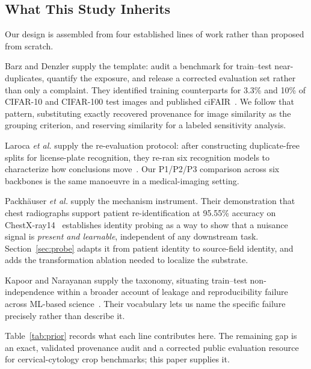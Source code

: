 \documentclass[conference]{IEEEtran}
\newcommand{\protocol}[1]{\textsf{#1}}
\begin{document}
\subsection{What This Study Inherits}
Our design is assembled from four established lines of work rather than proposed from scratch.

Barz and Denzler supply the template: audit a benchmark for train--test near-duplicates, quantify the exposure, and release a corrected evaluation set rather than only a complaint.
They identified training counterparts for 3.3\% and 10\% of CIFAR-10 and CIFAR-100 test images and published ciFAIR~\cite{barz2020cifair}.
We follow that pattern, substituting exactly recovered provenance for image similarity as the grouping criterion, and reserving similarity for a labeled sensitivity analysis.

Laroca \emph{et al.} supply the re-evaluation protocol: after constructing duplicate-free splits for license-plate recognition, they re-ran six recognition models to characterize how conclusions move~\cite{laroca2023lpr}.
Our \protocol{P1}/\protocol{P2}/\protocol{P3} comparison across six backbones is the same manoeuvre in a medical-imaging setting.

Packh\"auser \emph{et al.} supply the mechanism instrument.
Their demonstration that chest radiographs support patient re-identification at 95.55\% accuracy on ChestX-ray14~\cite{packhauser2022reidentification} establishes identity probing as a way to show that a nuisance signal is \emph{present and learnable}, independent of any downstream task.
Section~\ref{sec:probe} adapts it from patient identity to source-field identity, and adds the transformation ablation needed to localize the substrate.

Kapoor and Narayanan supply the taxonomy, situating train--test non-independence within a broader account of leakage and reproducibility failure across ML-based science~\cite{kapoor2023leakage}.
Their vocabulary lets us name the specific failure precisely rather than describe it.

Table~\ref{tab:prior} records what each line contributes here.
The remaining gap is an exact, validated provenance audit and a corrected public evaluation resource for cervical-cytology crop benchmarks; this paper supplies it.
\end{document}
